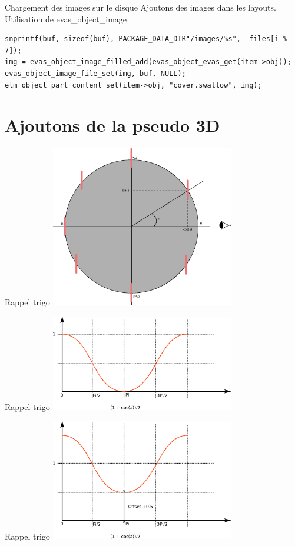 \documentclass{beamer}
\newcounter{image}
\begin{document}
\begin{frame}[fragile]{Chargement des images sur le disque}
Ajoutons des images dans les layouts. \\
Utilisation de evas\_object\_image
\begin{lstlisting}
snprintf(buf, sizeof(buf), PACKAGE_DATA_DIR"/images/%s",  files[i % 7]);
img = evas_object_image_filled_add(evas_object_evas_get(item->obj));
evas_object_image_file_set(img, buf, NULL);
elm_object_part_content_set(item->obj, "cover.swallow", img);
\end{lstlisting}
\end{frame}

\section{Ajoutons de la pseudo 3D}


\begin{frame}[fragile]{Rappel trigo}
\includegraphics[width=8cm]{trigo.eps}
\end{frame}


\begin{frame}[fragile]{Rappel trigo}
\includegraphics[width=8cm]{cosa.eps}
\end{frame}

\begin{frame}[fragile]{Rappel trigo}
\includegraphics[width=8cm]{cosb.eps}
\end{frame}
\end{document}
